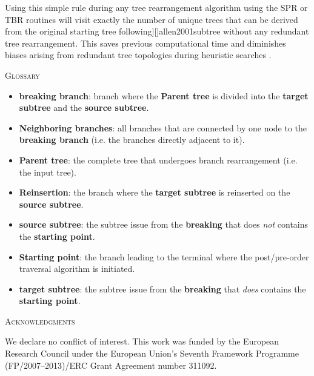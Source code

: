 \documentclass[12pt,letterpaper]{article}
\renewcommand{\section}[1]{%
\bigskip
\begin{center}
\begin{Large}
\normalfont\scshape #1
\medskip
\end{Large}
\end{center}}
\begin{document}
Using this simple rule during any tree rearrangement algorithm using the SPR or TBR routines will visit exactly the number of unique trees that can be derived from the original starting tree following][]{allen2001subtree} without any redundant tree rearrangement.
This saves previous computational time and diminishes biases arising from redundant tree topologies during heuristic searches \citep{goloboff2014bias}.

\section{Glossary}
\label{Glossary}

\begin{itemize}
    \item{\textbf{breaking branch}: branch where the \textbf{Parent tree} is divided into the \textbf{target subtree} and the \textbf{source subtree}.}
    \item{\textbf{Neighboring branches}: all branches that are connected by one node to the \textbf{breaking branch} (i.e. the branches directly adjacent to it).}
    \item{\textbf{Parent tree}: the complete tree that undergoes branch rearrangement (i.e. the input tree).}
    \item{\textbf{Reinsertion}: the branch where the \textbf{target subtree} is reinserted on the \textbf{source subtree}.}
    \item{\textbf{source subtree}: the subtree issue from the \textbf{breaking} that does \textit{not} contains the \textbf{starting point}.}
    \item{\textbf{Starting point}: the branch leading to the terminal where the post/pre-order traversal algorithm is initiated.}
    \item{\textbf{target subtree}: the subtree issue from the \textbf{breaking} that \textit{does} contains the \textbf{starting point}.}
\end{itemize}


\section{Acknowledgments}
We declare no conflict of interest. This work was funded by the European Research Council under the European Union’s Seventh Framework Programme (FP/2007–2013)/ERC Grant Agreement number 311092.



\end{document}
